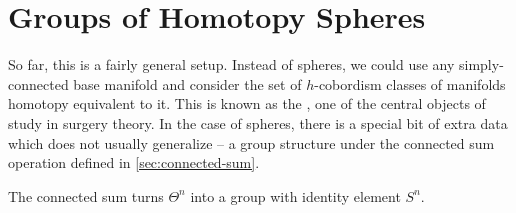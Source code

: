 \section{Groups of Homotopy Spheres}\label{sec:groups-of-homotopy-spheres}

So far, this is a fairly general setup. Instead of spheres, we could use any simply-connected base manifold and consider the set of $h$-cobordism classes of manifolds homotopy equivalent to it. This is known as the , one of the central objects of study in surgery theory. In the case of spheres, there is a special bit of extra data which does not usually generalize -- a group structure under the connected sum operation defined in \cref{sec:connected-sum}. 

\begin{theorem}\label{thm:group-of-homotopy-spheres}
	The connected sum turns $\Theta^n$ into a group with identity element $S^n$.
\end{theorem}

